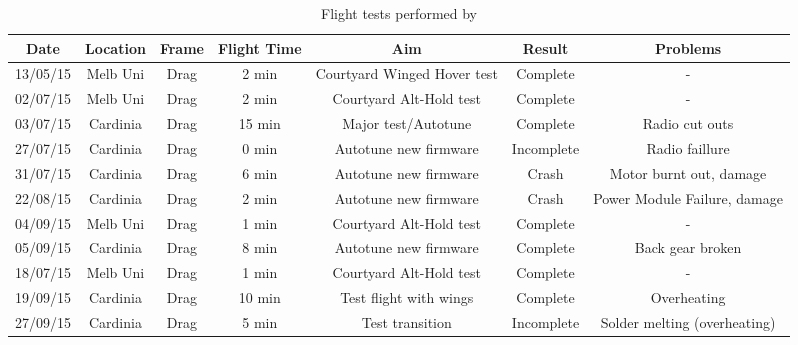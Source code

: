 



\label{sec:diary}
\begin{table}[htbp]
	\centering
	\begin{tabular}{|c|c|c|c|c|c|c|}
		\hline Date & Location & Frame & Flight Time & Aim & Result & Problems \\ 
		\hline 13/05/15 & Melb Uni & Drag & 2 min & Courtyard Winged Hover test & Complete & - \\ 
		\hline 02/07/15 & Melb Uni & Drag & 2 min & Courtyard Alt-Hold test & Complete & - \\ 
		\hline 03/07/15 & Cardinia & Drag & 15 min & Major test/Autotune & Complete & Radio cut outs \\ 
		\hline 27/07/15 & Cardinia  & Drag & 0 min & Autotune new firmware & Incomplete & Radio faillure \\ 
		\hline 31/07/15 & Cardinia  & Drag & 6 min & Autotune new firmware & Crash & Motor burnt out, damage  \\ 
		\hline 22/08/15 & Cardinia  & Drag & 2 min & Autotune new firmware & Crash & Power Module Failure, damage\\
		\hline 04/09/15 & Melb Uni & Drag & 1 min & Courtyard Alt-Hold test & Complete & - \\  
		\hline 05/09/15 & Cardinia  & Drag & 8 min & Autotune new firmware & Complete & Back gear broken\\
		\hline 18/07/15 & Melb Uni & Drag & 1 min & Courtyard Alt-Hold test & Complete & - \\  
		\hline 19/09/15 & Cardinia  & Drag & 10 min & Test flight with wings & Complete & Overheating \\ 
		\hline 27/09/15 & Cardinia  & Drag & 5 min & Test transition & Incomplete & Solder melting (overheating) \\ 
		\hline 
	\end{tabular} 
	\caption{Flight tests performed by \ID}
	\label{tab:tests}
\end{table}


